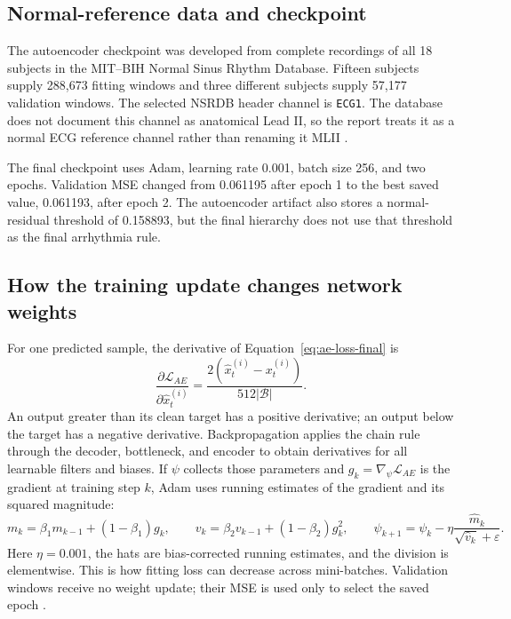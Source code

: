 \subsection{Normal-reference data and checkpoint}

The autoencoder checkpoint was developed from complete recordings of all 18
subjects in the MIT--BIH Normal Sinus Rhythm Database. Fifteen subjects supply
288,673 fitting windows and three different subjects supply 57,177 validation
windows. The selected NSRDB header channel is \texttt{ECG1}. The database does
not document this channel as anatomical Lead II, so the report treats it as a
normal ECG reference channel rather than renaming it MLII \cite{nsrdb}.

The final checkpoint uses Adam, learning rate 0.001, batch size 256, and two
epochs. Validation MSE changed from 0.061195 after epoch 1 to the best saved
value, 0.061193, after epoch 2. The autoencoder artifact also stores a
normal-residual threshold of 0.158893, but the final hierarchy does not use
that threshold as the final arrhythmia rule.

\subsection{How the training update changes network weights}

For one predicted sample, the derivative of
Equation~\ref{eq:ae-loss-final} is
\begin{equation}
 \frac{\partial\mathcal{L}_{AE}}
 {\partial\widehat x_t^{(i)}}=
 \frac{2(\widehat x_t^{(i)}-x_t^{(i)})}{512|\mathcal{B}|}.
 \label{eq:method-ae-output-gradient}
\end{equation}
An output greater than its clean target has a positive derivative; an output
below the target has a negative derivative. Backpropagation applies the chain
rule through the decoder, bottleneck, and encoder to obtain derivatives for
all learnable filters and biases. If $\psi$ collects those parameters and
$g_k=\nabla_\psi\mathcal{L}_{AE}$ is the gradient at training step $k$, Adam
uses running estimates of the gradient and its squared magnitude:
\begin{equation}
 m_k=\beta_1m_{k-1}+(1-\beta_1)g_k,\qquad
 v_k=\beta_2v_{k-1}+(1-\beta_2)g_k^2,\qquad
 \psi_{k+1}=\psi_k-\eta
 \frac{\widehat m_k}{\sqrt{\widehat v_k}+\varepsilon}.
 \label{eq:method-ae-adam}
\end{equation}
Here $\eta=0.001$, the hats are bias-corrected running estimates, and the
division is elementwise. This is how fitting loss can decrease across
mini-batches. Validation windows receive no weight update; their MSE is used
only to select the saved epoch \cite{kingma2015adam}.

